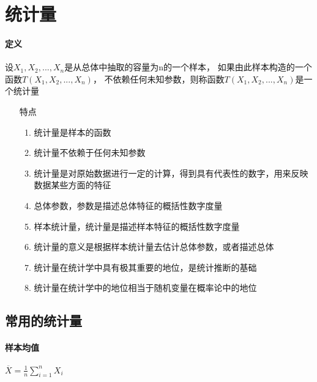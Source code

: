 \documentclass[UTF8,10pt]{book}
\begin{document}
    \section{统计量}
        \paragraph{定义} 设$X_1,X_2,...,X_n$是从总体中抽取的容量为n的一个样本，
        如果由此样本构造的一个函数$T(X_1,X_2,...,X_n)$，
        不依赖任何未知参数，则称函数$T(X_1,X_2,...,X_n)$是一个统计量

        \begin{itemize}
            \item [特点] {
                \begin{enumerate}
                    \item 统计量是样本的函数
                    \item 统计量不依赖于任何未知参数
                    
                    \item 统计量是对原始数据进行一定的计算，得到具有代表性的数字，用来反映数据某些方面的特征
                   
                    \item 总体参数，参数是描述总体特征的概括性数字度量
                    \item 样本统计量，统计量是描述样本特征的概括性数字度量
                    \item 统计量的意义是根据样本统计量去估计总体参数，或者描述总体
                    
                    \item 统计量在统计学中具有极其重要的地位，是{\kaishu 统计推断}的基础
                    \item 统计量在统计学中的地位相当于{\kaishu 随机变量}在概率论中的地位
                \end{enumerate}
            }
        \end{itemize}

        \subsection{常用的统计量}


            \paragraph{样本均值}  $ \overline{X} = \frac{1}{n} \sum_{i=1}^n X_i $
\end{document}
